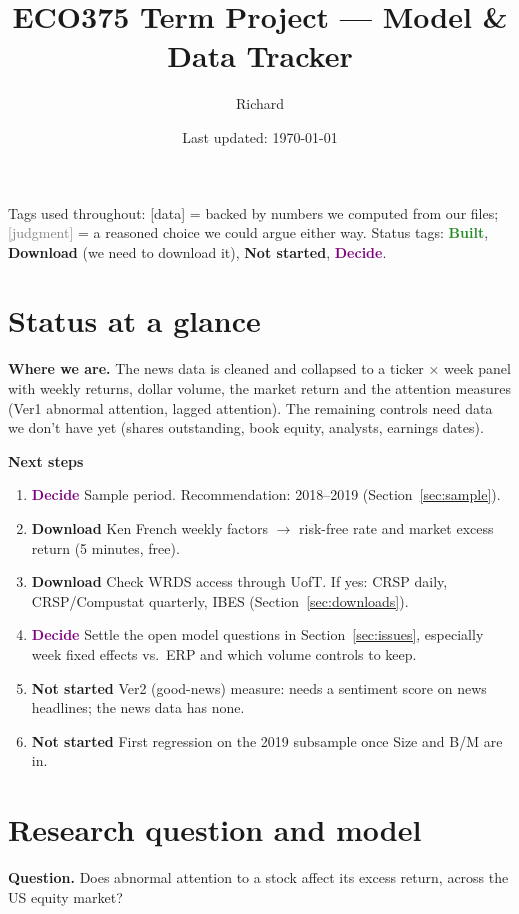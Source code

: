 \documentclass[11pt]{article}
\title{ECO375 Term Project --- Model \& Data Tracker}
\author{Richard}
\date{Last updated: \today}
\newcommand{\done}{\textcolor{ForestGreen}{\textbf{Built}}}
\newcommand{\dl}{\textcolor{BurntOrange}{\textbf{Download}}}
\newcommand{\todo}{\textcolor{BrickRed}{\textbf{Not started}}}
\newcommand{\decide}{\textcolor{Purple}{\textbf{Decide}}}
\newcommand{\data}{\textcolor{NavyBlue}{\textsf{[data]}}}
\newcommand{\judg}{\textcolor{Gray}{\textsf{[judgment]}}}
\begin{document}
\maketitle

\noindent Tags used throughout: \data{} = backed by numbers we computed from our files; \judg{} = a reasoned choice we could argue either way. Status tags: \done, \dl{} (we need to download it), \todo, \decide.

\tableofcontents

\section{Status at a glance}

\textbf{Where we are.} The news data is cleaned and collapsed to a ticker $\times$ week panel with weekly returns, dollar volume, the market return and the attention measures (Ver1 abnormal attention, lagged attention). The remaining controls need data we don't have yet (shares outstanding, book equity, analysts, earnings dates).

\textbf{Next steps}
\begin{enumerate}
  \item \decide{} Sample period. Recommendation: 2018--2019 (Section~\ref{sec:sample}).
  \item \dl{} Ken French weekly factors $\rightarrow$ risk-free rate and market excess return (5 minutes, free).
  \item \dl{} Check WRDS access through UofT. If yes: CRSP daily, CRSP/Compustat quarterly, IBES (Section~\ref{sec:downloads}).
  \item \decide{} Settle the open model questions in Section~\ref{sec:issues}, especially week fixed effects vs.\ ERP and which volume controls to keep.
  \item \todo{} Ver2 (good-news) measure: needs a sentiment score on news headlines; the news data has none.
  \item \todo{} First regression on the 2019 subsample once Size and B/M are in.
\end{enumerate}

\section{Research question and model}

\textbf{Question.} Does abnormal attention to a stock affect its excess return, across the US equity market?
\end{document}
